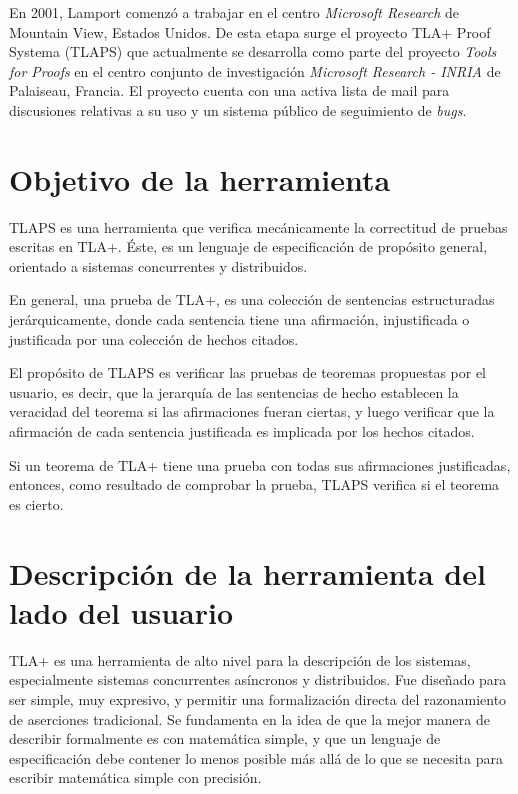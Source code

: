 \documentclass[spanish]{llncs}
\begin{document}
En 2001, Lamport comenzó a trabajar en el centro \textit{Microsoft Research} de Mountain View, Estados Unidos. De esta etapa surge el proyecto TLA+ Proof Systema (TLAPS) que actualmente se desarrolla como parte del proyecto \textit{Tools for Proofs} en el centro conjunto de investigación \textit{Microsoft Research - INRIA} de Palaiseau, Francia. El proyecto cuenta con una activa lista de mail para discusiones relativas a su uso y un sistema público de seguimiento de \textit{bugs}.


\section{Objetivo de la herramienta}

TLAPS es una herramienta que verifica mecánicamente la correctitud
de pruebas escritas en TLA+.
Éste, es un lenguaje de especificación de propósito general, orientado a sistemas
concurrentes y distribuidos.

En general, una prueba de TLA+, es una colección de sentencias estructuradas jerárquicamente,
donde cada sentencia tiene una afirmación, injustificada o justificada por una colección de hechos citados.

El propósito de TLAPS es verificar las pruebas de teoremas propuestas por el usuario, es decir,
que la jerarquía de las sentencias de hecho establecen la veracidad del teorema si las afirmaciones fueran ciertas,
y luego verificar que la afirmación de cada sentencia justificada es implicada por los hechos citados.

Si un teorema de TLA+ tiene una prueba con todas sus afirmaciones justificadas, entonces, como resultado
de comprobar la prueba, TLAPS verifica si el teorema es cierto.

\section{Descripción de la herramienta del lado del usuario}

TLA+ es una herramienta de alto nivel para la descripción de los sistemas, especialmente sistemas concurrentes asíncronos y distribuidos. Fue diseñado para ser simple, muy expresivo, 
y permitir una formalización directa del razonamiento de aserciones tradicional.
Se fundamenta en la idea de que la mejor manera de describir formalmente es con matemática simple, y que un lenguaje de especificación debe contener lo menos posible más allá de lo 
que se necesita para escribir matemática simple con precisión.
\end{document}
